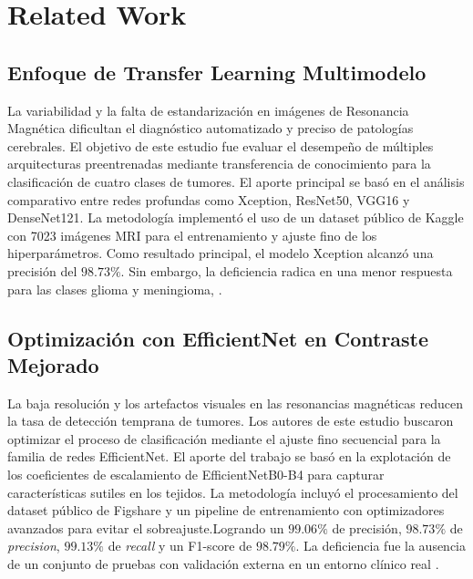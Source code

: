 \section{Related Work}
\label{sec:related_work}

\subsection{Enfoque de Transfer Learning Multimodelo}
La variabilidad y la falta de estandarización en imágenes de Resonancia Magnética dificultan el diagnóstico automatizado y preciso de patologías cerebrales. El objetivo de este estudio fue evaluar el desempeño de múltiples arquitecturas preentrenadas mediante transferencia de conocimiento para la clasificación de cuatro clases de tumores. El aporte principal se basó en el análisis comparativo entre redes profundas como Xception, ResNet50, VGG16 y DenseNet121. La metodología implementó el uso de un dataset público de Kaggle con 7023 imágenes MRI para el entrenamiento y ajuste fino de los hiperparámetros. Como resultado principal, el modelo Xception alcanzó una precisión del $98.73\%$. Sin embargo, la deficiencia radica en una menor respuesta para las clases glioma y meningioma, \cite{Disci2025}.

\subsection{Optimización con EfficientNet en Contraste Mejorado}
La baja resolución y los artefactos visuales en las resonancias magnéticas reducen la tasa de detección temprana de tumores. Los autores de este estudio buscaron optimizar el proceso de clasificación mediante el ajuste fino secuencial para la familia de redes EfficientNet. El aporte del trabajo se basó en la explotación de los coeficientes de escalamiento de EfficientNetB0-B4 para capturar características sutiles en los tejidos. La metodología incluyó el procesamiento del dataset público de Figshare y un pipeline de entrenamiento con optimizadores avanzados para evitar el sobreajuste.Logrando un $99.06\%$ de precisión, $98.73\%$ de \textit{precision}, $99.13\%$ de \textit{recall} y un F1-score de $98.79\%$. La deficiencia fue la ausencia de un conjunto de pruebas con validación externa en un entorno clínico real \cite{BabuVimala2023}.

